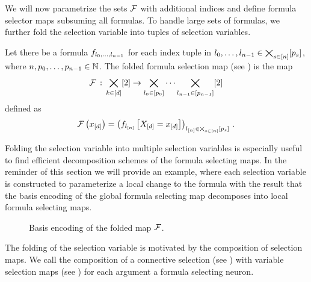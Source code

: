 
We will now parametrize the sets $\mathcal{F}$ with additional indices and define formula selector maps subsuming all formulas.
To handle large sets of formulas, we further fold the selection variable into tuples of selection variables.

\begin{definition}
    \label{def:formulaSelector}
    Let there be a formula $f_{l_{0},\ldots,l_{n-1}}$ for each index tuple in $l_{0},\ldots,l_{n-1}\in\bigtimes_{s\in[n]}[p_{s}]$, where $n,p_{0},\ldots,p_{n-1}\in\mathbb{N}$.
    The folded formula selection map (see ) is the map
    \begin{align*}
        \mathcal{F} \,:\, \bigtimes_{k\in[d]}[2] \rightarrow \bigtimes_{l_{0}\in[p_{0}]} \cdots \bigtimes_{l_{n-1}\in[p_{n-1}]} [2]
    \end{align*}
    defined as
    \begin{align*}
        \mathcal{F}\left(x_{[d]}\right) = \left( f_{l_{[n]}}\left[X_{[d]}=x_{[d]}\right] \right)_{l_{[n]}\in\bigtimes_{s\in[n]}[p_{s}]} \, .
    \end{align*}
\end{definition}

Folding the selection variable into multiple selection variables is especially useful to find efficient decomposition schemes of the formula selecting maps.
In the reminder of this section we will provide an example, where each selection variable is constructed to parameterize a local change to the formula with the result that the basis encoding of the global formula selecting map decomposes into local formula selecting maps.


\begin{figure}[t]
    \begin{center}
        
    \end{center}
    \caption{Basis encoding of the folded map $\mathcal{F}$.}
    \label{fig:foldedSelector}
\end{figure}






The folding of the selection variable is motivated by the composition of selection maps.
We call the composition of a connective selection (see ) with variable selection maps (see ) for each argument a formula selecting neuron.


